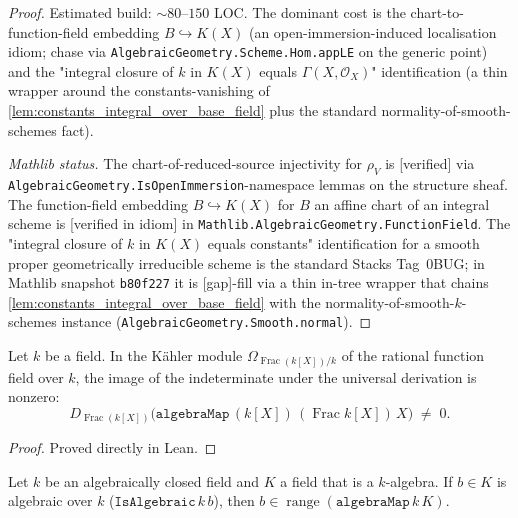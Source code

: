 \begin{proof}
  Estimated build: \(\sim 80\)--\(150\) LOC. The dominant cost is the chart-to-function-field embedding \(B \hookrightarrow K(X)\) (an open-immersion-induced localisation idiom; chase via \texttt{AlgebraicGeometry.Scheme.Hom.appLE} on the generic point) and the "integral closure of \(k\) in \(K(X)\) equals \(\Gamma(X, \mathcal O_X)\)" identification (a thin wrapper around the constants-vanishing of \cref{lem:constants_integral_over_base_field} plus the standard normality-of-smooth-schemes fact).

  \emph{Mathlib status.} The chart-of-reduced-source injectivity for \(\rho_V\) is [verified] via \texttt{AlgebraicGeometry.IsOpenImmersion}-namespace lemmas on the structure sheaf. The function-field embedding \(B \hookrightarrow K(X)\) for \(B\) an affine chart of an integral scheme is [verified in idiom] in \texttt{Mathlib.AlgebraicGeometry.FunctionField}. The "integral closure of \(k\) in \(K(X)\) equals constants" identification for a smooth proper geometrically irreducible scheme is the standard Stacks Tag~0BUG; in Mathlib snapshot \texttt{b80f227} it is [gap]-fill via a thin in-tree wrapper that chains \cref{lem:constants_integral_over_base_field} with the normality-of-smooth-\(k\)-schemes instance (\texttt{AlgebraicGeometry.Smooth.normal}).
\end{proof}

\begin{lemma}
  \label{lem:ratfunc_D_X_ne_zero}
  Let \(k\) be a field. In the K\"ahler module \(\Omega_{\operatorname{Frac}(k[X])/k}\) of the rational function field over \(k\), the image of the indeterminate under the universal derivation is nonzero:
  \[
    D_{\operatorname{Frac}(k[X])}\bigl(\mathtt{algebraMap}\,(k[X])\,(\operatorname{Frac} k[X])\,X\bigr) \;\neq\; 0 .
  \]
\end{lemma}

\begin{proof}
  Proved directly in Lean.
\end{proof}

\begin{lemma}
  \label{lem:algebraic_mem_range}
  Let \(k\) be an algebraically closed field and \(K\) a field that is a \(k\)-algebra. If \(b \in K\) is algebraic over \(k\) (\(\mathtt{IsAlgebraic}\,k\,b\)), then \(b \in \operatorname{range}(\mathtt{algebraMap}\,k\,K)\).
\end{lemma}

